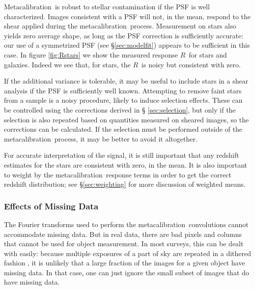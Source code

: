 \documentclass[a4paper,fleqn,usenatbib]{mnras}
\newcommand{\mcal}{metacalibration}
\newcommand{\Mcal}{Metacalibration}
\newcommand{\mcalR}{$R$}
\newcommand{\nsimNStar}{$5.6 \times 10^8$}
\newcommand{\nsimNstarperc}{10\%}
\newcommand{\bdsim}{\texttt{BDK}}
\newcommand{\bdstar}{\texttt{BDK+Stars}}
\begin{document}

\Mcal\ is robust to stellar contamination if the PSF is well
characterized.  Images consistent with a PSF will not, in the mean, respond to the shear
applied during the \mcal\ process.  Measurement on stars also yields zero average shape, as
long as the PSF correction is sufficiently accurate: our use of a symmetrized
PSF (see \S \ref{sec:modelfit}) appears to be sufficient in this case.
In figure \ref{fig:Rstars} we show the measured response \mcalR\ for stars and
galaxies.  Indeed we see that, for stars, the \mcalR\ is noisy but consistent
with zero.

If the additional variance is tolerable, it may be useful to include stars in a
shear analysis if the PSF is sufficiently well known.  Attempting to remove
faint stars from a sample is a noisy procedure, likely to induce selection
effects.  These can be controlled using the corrections derived in \S
\ref{sec:selection}, but only if the selection is also repeated based on
quantities measured on sheared images, so the corrections can be calculated.
If the selection must be performed outside of the \mcal\ process, it may be
better to avoid it altogether.

For accurate interpretation of the signal, it is still important that any
redshift estimates for the stars are consistent with zero, in the mean. It is
also important to weight by the \mcal\ response terms in order to get the
correct redshift distribution; see \S \ref{sec:weighting} for more
discussion of weighted means.

\subsubsection{Effects of Missing Data}

The Fourier transforms used to perform the \mcal\ convolutions cannot
accommodate missing data.  But in real data, there are bad pixels and columns
that cannot be used for object measurement.  In most surveys, this can be dealt
with easily: because multiple exposures of a part of sky are repeated in a
dithered fashion \citep[e.g.][]{DESWhitePaper}, it is unlikely that a large
fraction of the images for a given object have missing data.  In that case, one
can just ignore the small subset of images that do have missing data.
\end{document}
